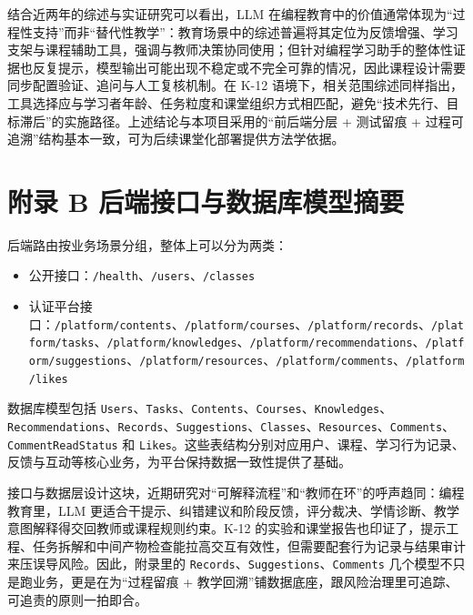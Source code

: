 结合近两年的综述与实证研究可以看出，LLM 在编程教育中的价值通常体现为“过程性支持”而非“替代性教学”：教育场景中的综述普遍将其定位为反馈增强、学习支架与课程辅助工具，强调与教师决策协同使用\cite{wang2024llmedu,raihan2025cseduslr,pitts2025llmprogedu}；但针对编程学习助手的整体性证据也反复提示，模型输出可能出现不稳定或不完全可靠的情况，因此课程设计需要同步配置验证、追问与人工复核机制\cite{pirzado2024pitfalls,jeon2023complementary}。在 K-12 语境下，相关范围综述同样指出，工具选择应与学习者年龄、任务粒度和课堂组织方式相匹配，避免“技术先行、目标滞后”的实施路径\cite{yim2024k12scoping}。上述结论与本项目采用的“前后端分层 + 测试留痕 + 过程可追溯”结构基本一致，可为后续课堂化部署提供方法学依据。

\section*{附录 B 后端接口与数据库模型摘要}\label{ux9644ux5f55-b-ux540eux7aefux63a5ux53e3ux4e0eux6570ux636eux5e93ux6a21ux578bux6458ux8981}

后端路由按业务场景分组，整体上可以分为两类：

\begin{itemize}
  \item 公开接口：\texttt{/health}、\texttt{/users}、\texttt{/classes}
  \item 认证平台接口：\texttt{/platform/contents}、\texttt{/platform/courses}、\texttt{/platform/records}、\texttt{/platform/tasks}、\texttt{/platform/knowledges}、\texttt{/platform/recommendations}、\texttt{/platform/suggestions}、\texttt{/platform/resources}、\texttt{/platform/comments}、\texttt{/platform/likes}
\end{itemize}

数据库模型包括 \texttt{Users}、\texttt{Tasks}、\texttt{Contents}、\texttt{Courses}、\texttt{Knowledges}、\texttt{Recommendations}、\texttt{Records}、\texttt{Suggestions}、\texttt{Classes}、\texttt{Resources}、\texttt{Comments}、\texttt{CommentReadStatus} 和 \texttt{Likes}。这些表结构分别对应用户、课程、学习行为记录、反馈与互动等核心业务，为平台保持数据一致性提供了基础。

接口与数据层设计这块，近期研究对“可解释流程”和“教师在环”的呼声趋同：编程教育里，LLM 更适合干提示、纠错建议和阶段反馈，评分裁决、学情诊断、教学意图解释得交回教师或课程规则约束\cite{raihan2025cseduslr,ma2024teachableagent,jeon2023complementary}。K-12 的实验和课堂报告也印证了，提示工程、任务拆解和中间产物检查能拉高交互有效性，但需要配套行为记录与结果审计来压误导风险\cite{tang2025middleschool,gonzalez2025k12gpt}。因此，附录里的 \texttt{Records}、\texttt{Suggestions}、\texttt{Comments} 几个模型不只是跑业务，更是在为“过程留痕 + 教学回溯”铺数据底座，跟风险治理里可追踪、可追责的原则一拍即合\cite{pirzado2024pitfalls,humble2024risk,tlili2023devilangel}。

